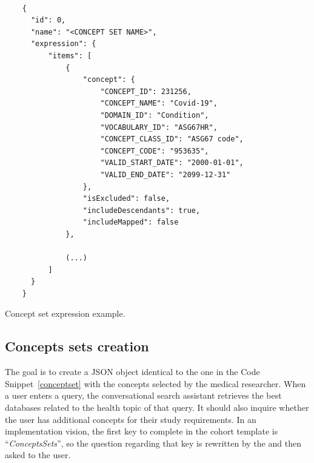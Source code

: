 \begin{listing}[H]
  \begin{verbatim}
      
    {
      "id": 0,
      "name": "<CONCEPT SET NAME>",
      "expression": {
          "items": [
              {
                  "concept": {
                      "CONCEPT_ID": 231256,
                      "CONCEPT_NAME": "Covid-19",
                      "DOMAIN_ID": "Condition",
                      "VOCABULARY_ID": "ASG67HR",
                      "CONCEPT_CLASS_ID": "ASG67 code",
                      "CONCEPT_CODE": "953635",
                      "VALID_START_DATE": "2000-01-01",
                      "VALID_END_DATE": "2099-12-31"
                  },
                  "isExcluded": false,
                  "includeDescendants": true,
                  "includeMapped": false
              },
              
              (...)
          ]
      }
    }

  \end{verbatim}
\caption[Concept set expression example]{Concept set expression example.}
\label{conceptset}
\end{listing}  



\subsection{Concepts sets creation}




The goal is to create a JSON object identical to the one in the Code Snippet~\ref{conceptset} with the concepts selected by the medical researcher. When a user enters a query, the conversational search assistant retrieves the best databases related to the health topic of that query. It should also inquire whether the user has additional concepts for their study requirements. In an implementation vision, the first key to complete in the cohort template is ``\textit{ConceptsSets}'', so the question regarding that key is rewritten by the {\llm} and then asked to the user.

